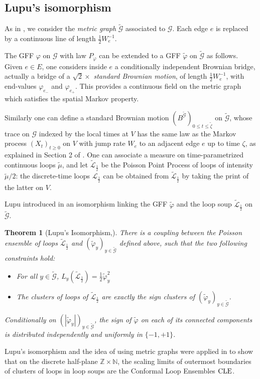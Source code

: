 \documentclass[11pt,a4paper]{amsart}
\numberwithin{equation}{section}
\newtheorem{theorem}{Theorem}
\begin{document}
\subsection{Lupu's isomorphism}
\label{sec:lupu}
As in \cite{Lupu2014LoopsGFF}, we consider the \textit{metric graph} $\tilde{\mathcal{G}}$ associated to $\mathcal{G}$. Each edge $e$ is replaced by a continuous line of length 
$\frac{1}{2}W_{e}^{-1}$. 

The GFF $\varphi$ on $\mathcal{G}$ with law $P_\varphi$ can be extended to a GFF $\tilde{\varphi}$ on $\tilde{\mathcal{G}}$ as follows. Given $e\in E$, one considers inside $e$ a conditionally independent Brownian bridge, actually a bridge of a $\sqrt{2} \times$ 
\textit{standard Brownian motion}, of length $\frac{1}{2}W_{e}^{-1}$, with end-values
$\varphi_{e_{-}}$ and $\varphi_{e_{+}}$. This provides a continuous field on the metric graph which satisfies the spatial Markov property. 

Similarly one can define a standard Brownian motion $(B^{\tilde{\mathcal{G}}})_{0\le t\le \tilde{\zeta}}$ on $\tilde{\mathcal{G}}$, whose trace on $\mathcal{G}$ indexed by the local times at $V$ has the same law as the Markov process $(X_t)_{t\ge0}$ on $V$ with jump rate $W_e$ to an adjacent edge $e$ up to time $\zeta$, as explained in Section 2 of \cite{Lupu2014LoopsGFF}. One can associate a measure on time-parametrized continuous loops $\tilde{\mu}$, and let $\tilde{\mathcal{L}}_{\frac{1}{2}}$ be the Poisson Point Process of loops of intensity $\tilde{\mu}/2$: the discrete-time loops $\mathcal{L}_{\frac{1}{2}}$ can be obtained from $\tilde{\mathcal{L}}_{\frac{1}{2}}$ by taking the print of the latter on $V$.

Lupu introduced in \cite{Lupu2014LoopsGFF} an isomorphism linking  the GFF $\tilde{\varphi}$ and the loop soup $\tilde{\mathcal{L}}_{\frac{1}{2}}$ on $\tilde{\mathcal{G}}$. 

\begin{theorem}[Lupu's Isomorphism,\cite{Lupu2014LoopsGFF}]
\label{thm:Lupu} 
There is a coupling between the Poisson ensemble of loops $\tilde{\mathcal{L}}_{\frac{1}{2}}$ and $(\tilde{\varphi}_y)_{y\in\tilde{\mathcal{G}}}$ defined above, such that the two following constraints hold: 
\begin{itemize}
\item For all $y\in\tilde{\mathcal{G}}$, $L_y(\tilde{{\mathcal{L}}}_{\frac{1}{2}})=\frac{1}{2}\tilde{\varphi}_y^2$
\item The clusters of loops of $\tilde{\mathcal{L}}_{\frac{1}{2}}$ are exactly the sign clusters of $(\tilde{\varphi}_y)_{y\in\tilde{\mathcal{G}}}$.
\end{itemize}
Conditionally on $(|\tilde{\varphi}_y|)_{y\in\tilde{\mathcal{G}}}$, the sign of $\tilde{\varphi}$ on each of its connected components is distributed independently and uniformly in $\{-1,+1\}$. 
\end{theorem}
Lupu's isomorphism and the idea of using metric graphs were applied in \cite{Lupu2015ConvCLE} to show that on the discrete half-plane $\mathbb{Z}\times\mathbb{N}$, the scaling limits of outermost boundaries of clusters of loops in loop soups are the Conformal Loop Ensembles $\hbox{CLE}$.
\end{document}
